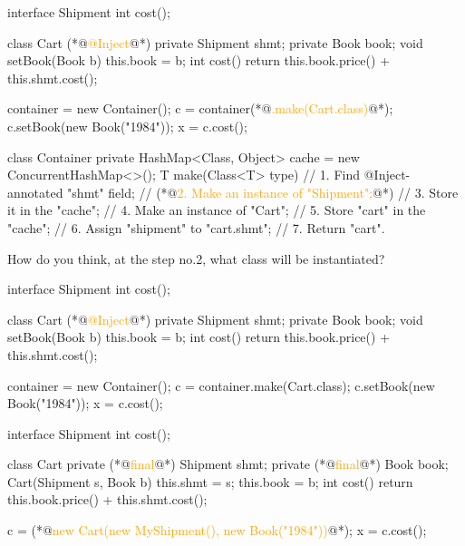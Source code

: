 \documentclass{article}
\begin{document}
\begin{pptWide}{2}
{\scriptsize\begin{ffcode}
interface Shipment
  int cost();

class Cart
  (*@\textcolor{orange}{@Inject}@*) private Shipment shmt;
  private Book book;
  void setBook(Book b)
    this.book = b;
  int cost()
    return this.book.price() + this.shmt.cost();

container = new Container();
c = container(*@\textcolor{orange}{.make(Cart.class)}@*);
c.setBook(new Book("1984"));
x = c.cost();
\end{ffcode}
}
\par\columnbreak\par
{\scriptsize\begin{ffcode}
class Container {
  private HashMap<Class, Object> cache =
    new ConcurrentHashMap<>();
  T make(Class<T> type) {
    // 1. Find @Inject-annotated "shmt" field;
    // (*@\textcolor{orange}{2. Make an instance of "Shipment";}@*)
    // 3. Store it in the "cache";
    // 4. Make an instance of "Cart";
    // 5. Store "cart" in the "cache";
    // 6. Assign "shipment" to "cart.shmt";
    // 7. Return "cart".
  }
}
\end{ffcode}
}
How do you think, at the step no.2,
what class will be instantiated?~\citep{bugayenko2014blog1003}
\end{pptWide}
\par
\plush{}

\begin{pptWide}{2}
{\scriptsize\begin{ffcode}
interface Shipment
  int cost();

class Cart
  (*@\textcolor{orange}{@Inject}@*) private Shipment shmt;
  private Book book;
  void setBook(Book b)
    this.book = b;
  int cost()
    return this.book.price() + this.shmt.cost();

container = new Container();
c = container.make(Cart.class);
c.setBook(new Book("1984"));
x = c.cost();
\end{ffcode}
}
\par\columnbreak\par
{\scriptsize\begin{ffcode}
interface Shipment
  int cost();

class Cart
  private (*@\textcolor{orange}{final}@*) Shipment shmt;
  private (*@\textcolor{orange}{final}@*) Book book;
  Cart(Shipment s, Book b)
    this.shmt = s;
    this.book = b;
  int cost()
    return this.book.price() + this.shmt.cost();

c = (*@\textcolor{orange}{new Cart(new MyShipment(), new Book("1984"))}@*);
x = c.cost();
\end{ffcode}
}
\end{pptWide}
\par
\plush{}
\end{document}
